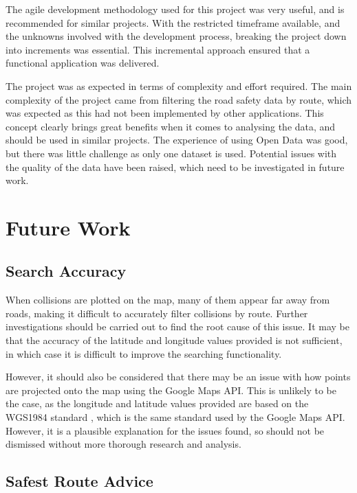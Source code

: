 \documentclass[authoryearcitations]{UoYCSproject}
\begin{document}
The agile development methodology used for this project was very useful, and is recommended for similar projects. With the restricted timeframe available, and the unknowns involved with the development process, breaking the project down into increments was essential. This incremental approach ensured that a functional application was delivered.

The project was as expected in terms of complexity and effort required. The main complexity of the project came from filtering the road safety data by route, which was expected as this had not been implemented by other applications. This concept clearly brings great benefits when it comes to analysing the data, and should be used in similar projects. The experience of using Open Data was good, but there was little challenge as only one dataset is used. Potential issues with the quality of the data have been raised, which need to be investigated in future work.

\section{Future Work}

\subsection{Search Accuracy}

When collisions are plotted on the map, many of them appear far away from roads, making it difficult to accurately filter collisions by route. Further investigations should be carried out to find the root cause of this issue. It may be that the accuracy of the latitude and longitude values provided is not sufficient, in which case it is difficult to improve the searching functionality.

However, it should also be considered that there may be an issue with how points are projected onto the map using the Google Maps API. This is unlikely to be the case, as the longitude and latitude values provided are based on the WGS1984 standard \citep{DepartmentforTransporta}, which is the same standard used by the Google Maps API. However, it is a plausible explanation for the issues found, so should not be dismissed without more thorough research and analysis.

\subsection{Safest Route Advice}
\end{document}
